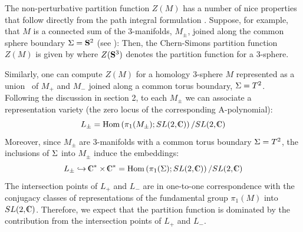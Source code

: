 


\ifig{}
{}

The non-perturbative partition function
$Z(M)$ has a number of nice properties
that follow directly from the path integral formulation \zwpathint.
Suppose, for example, that $M$ is a connected sum of
the 3-manifolds, $M_{\pm}$, joined along
the common sphere boundary $\Si=\S^2$ (see \munion):
%
\eqn{}
%
Then, the Chern-Simons partition function $Z(M)$ is given by
%
\eqn{}
%
where $Z (\S^3)$ denotes the partition function for a 3-sphere.

Similarly, one can compute $Z(M)$ for a homology 3-sphere $M$
represented as a union \msum\ of $M_+$ and $M_-$
joined along a common torus boundary, $\Si=T^2$.
Following the discussion in section 2,
to each $M_{\pm}$ we can associate a representation variety
(the zero locus of the corresponding A-polynomial):
$$
L_{\pm} = \Hom \left(\pi_1(M_{\pm}); SL(2,\IC)\right)/SL(2,\IC)
$$
Moreover, since $M_{\pm}$ are 3-manifolds with
a common torus boundary $\Si = T^2$,
the inclusions of $\Si$ into $M_{\pm}$ induce the embeddings:
$$
L_{\pm} \hookrightarrow \IC^* \times \IC^*
= \Hom \left(\pi_1(\Si); SL(2,\IC)\right)/SL(2,\IC)
$$
The intersection points of $L_+$ and $L_-$ are
in one-to-one correspondence with the conjugacy classes of
representations of the fundamental group $\pi_1(M)$ into $SL(2,\IC)$.
Therefore, we expect that the partition function
%
\eqn{}
%
is dominated by the contribution from the intersection
points of $L_+$ and $L_-$.

%
%
%

